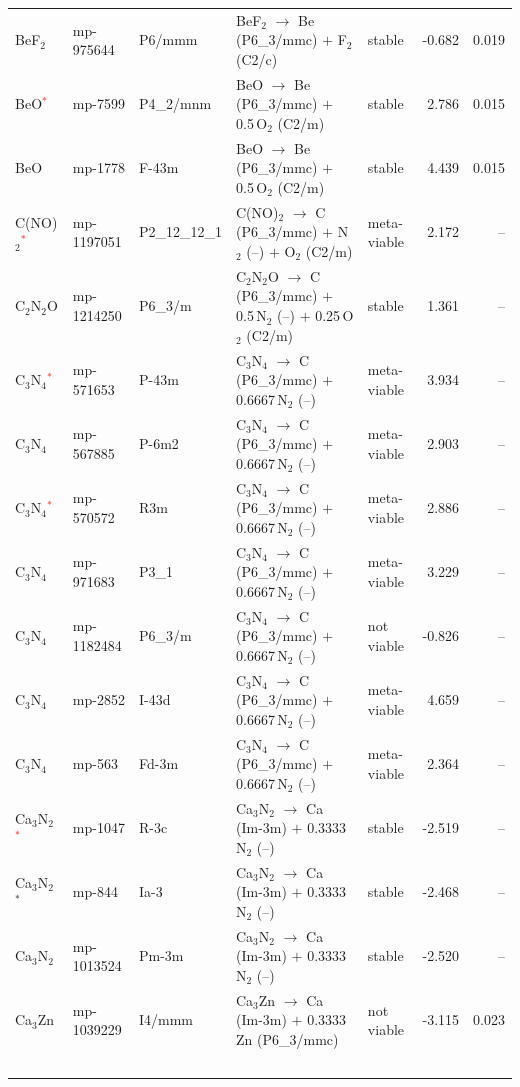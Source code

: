 \begin{longtable}{@{}ll l@{\hspace{4pt}} p{4.6cm} l@{\hspace{4pt}} rr@{}}
BeF$_{2}$ & mp-975644 & P6/mmm & BeF$_{2}$ $\to$ Be (P6\_3/mmc) $+$ F$_{2}$ (C2/c) & stable & -0.682 & 0.019 \\
BeO\textcolor{red}{$^*$} & mp-7599 & P4\_2/mnm & BeO $\to$ Be (P6\_3/mmc) $+$ 0.5\,O$_{2}$ (C2/m) & stable & 2.786 & 0.015 \\
BeO & mp-1778 & F-43m & BeO $\to$ Be (P6\_3/mmc) $+$ 0.5\,O$_{2}$ (C2/m) & stable & 4.439 & 0.015 \\
C(NO)$_{2}$\textcolor{red}{$^*$} & mp-1197051 & P2\_12\_12\_1 & C(NO)$_{2}$ $\to$ C (P6\_3/mmc) $+$ N$_{2}$ (--) $+$ O$_{2}$ (C2/m) & meta-viable & 2.172 & -- \\
C$_{2}$N$_{2}$O & mp-1214250 & P6\_3/m & C$_{2}$N$_{2}$O $\to$ C (P6\_3/mmc) $+$ 0.5\,N$_{2}$ (--) $+$ 0.25\,O$_{2}$ (C2/m) & stable & 1.361 & -- \\
C$_{3}$N$_{4}$\textcolor{red}{$^*$} & mp-571653 & P-43m & C$_{3}$N$_{4}$ $\to$ C (P6\_3/mmc) $+$ 0.6667\,N$_{2}$ (--) & meta-viable & 3.934 & -- \\
C$_{3}$N$_{4}$ & mp-567885 & P-6m2 & C$_{3}$N$_{4}$ $\to$ C (P6\_3/mmc) $+$ 0.6667\,N$_{2}$ (--) & meta-viable & 2.903 & -- \\
C$_{3}$N$_{4}$\textcolor{red}{$^*$} & mp-570572 & R3m & C$_{3}$N$_{4}$ $\to$ C (P6\_3/mmc) $+$ 0.6667\,N$_{2}$ (--) & meta-viable & 2.886 & -- \\
C$_{3}$N$_{4}$ & mp-971683 & P3\_1 & C$_{3}$N$_{4}$ $\to$ C (P6\_3/mmc) $+$ 0.6667\,N$_{2}$ (--) & meta-viable & 3.229 & -- \\
C$_{3}$N$_{4}$ & mp-1182484 & P6\_3/m & C$_{3}$N$_{4}$ $\to$ C (P6\_3/mmc) $+$ 0.6667\,N$_{2}$ (--) & not viable & -0.826 & -- \\
C$_{3}$N$_{4}$ & mp-2852 & I-43d & C$_{3}$N$_{4}$ $\to$ C (P6\_3/mmc) $+$ 0.6667\,N$_{2}$ (--) & meta-viable & 4.659 & -- \\
C$_{3}$N$_{4}$ & mp-563 & Fd-3m & C$_{3}$N$_{4}$ $\to$ C (P6\_3/mmc) $+$ 0.6667\,N$_{2}$ (--) & meta-viable & 2.364 & -- \\
Ca$_{3}$N$_{2}$\textcolor{red}{$^*$} & mp-1047 & R-3c & Ca$_{3}$N$_{2}$ $\to$ Ca (Im-3m) $+$ 0.3333\,N$_{2}$ (--) & stable & -2.519 & -- \\
Ca$_{3}$N$_{2}$$^*$ & mp-844 & Ia-3 & Ca$_{3}$N$_{2}$ $\to$ Ca (Im-3m) $+$ 0.3333\,N$_{2}$ (--) & stable & -2.468 & -- \\
Ca$_{3}$N$_{2}$ & mp-1013524 & Pm-3m & Ca$_{3}$N$_{2}$ $\to$ Ca (Im-3m) $+$ 0.3333\,N$_{2}$ (--) & stable & -2.520 & -- \\
Ca$_{3}$Zn & mp-1039229 & I4/mmm & Ca$_{3}$Zn $\to$ Ca (Im-3m) $+$ 0.3333\,Zn (P6\_3/mmc) & not viable & -3.115 & 0.023 \\
$$
\end{longtable}
